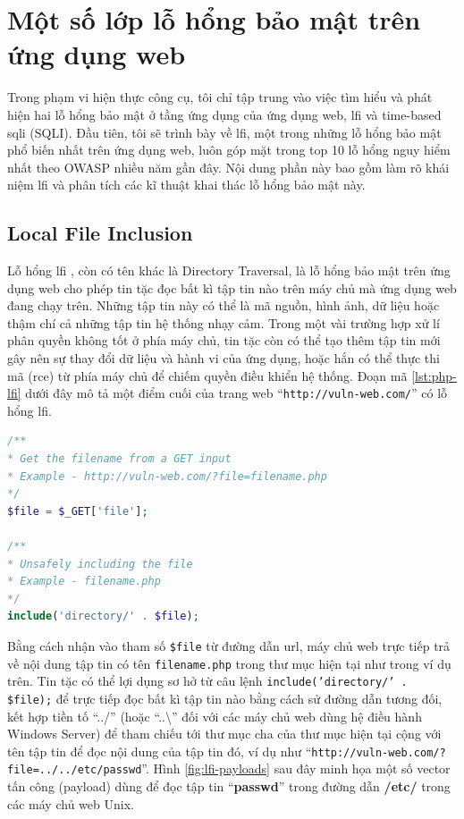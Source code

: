 \chapter{Một số lớp lỗ hổng bảo mật trên ứng dụng web}
Trong phạm vi hiện thực công cụ, tôi chỉ tập trung vào việc tìm hiểu và phát hiện hai lỗ hổng bảo mật ở tầng ứng dụng của ứng dụng web, \acrfull{lfi} và time-based \acrlong{sqli} (SQLI). Đầu tiên, tôi sẽ trình bày về \acrfull{lfi}, một trong những lỗ hổng bảo mật phổ biến nhất trên ứng dụng web, luôn góp mặt trong top 10 lỗ hổng nguy hiểm nhất theo OWASP \parencite{owasp-top-10} nhiều năm gần đây. Nội dung phần này bao gồm làm rõ khái niệm \acrshort{lfi} và phân tích các kĩ thuật khai thác lỗ hổng bảo mật này.
\section{Local File Inclusion}
Lỗ hổng \acrfull{lfi} \parencite{portswigger-directory-traversal, sullivan2011web}, còn có tên khác là Directory Traversal, là lỗ hổng bảo mật trên ứng dụng web cho phép tin tặc đọc bất kì tập tin nào trên máy chủ mà ứng dụng web đang chạy trên. Những tập tin này có thể là mã nguồn, hình ảnh, dữ liệu hoặc thậm chí cả những tập tin hệ thống nhạy cảm. Trong một vài trường hợp xử lí phân quyền không tốt ở phía máy chủ, tin tặc còn có thể tạo thêm tập tin mới gây nên sự thay đổi dữ liệu và hành vi của ứng dụng, hoặc hắn có thể thực thi mã (\acrshort{rce}) từ phía máy chủ để chiếm quyền điều khiển hệ thống. Đoạn mã \ref{lst:php-lfi} dưới đây mô tả một điểm cuối của trang web ``\texttt{http://vuln-web.com/}'' có lỗ hổng \acrshort{lfi}.
\begin{lstlisting}[language=php, label={lst:php-lfi},caption={Đoạn mã PHP có lỗ hổng Local File Inclusion}]
/**
* Get the filename from a GET input
* Example - http://vuln-web.com/?file=filename.php
*/
$file = $_GET['file'];

/**
* Unsafely including the file
* Example - filename.php
*/
include('directory/' . $file);
\end{lstlisting}
Bằng cách nhận vào tham số \texttt{\$file} từ đường dẫn \acrshort{url}, máy chủ web trực tiếp trả về nội dung tập tin có tên \texttt{filename.php} trong thư mục hiện tại như trong ví dụ trên. Tin tặc có thể lợi dụng sơ hở từ câu lệnh \texttt{include('directory/' . \$file);} để trực tiếp đọc bất kì tập tin nào bằng cách sử đường dẫn tương đối, kết hợp tiền tố ``../'' (hoặc ``..\textbackslash'' đối với các máy chủ web dùng hệ điều hành Windows Server) để tham chiếu tới thư mục cha của thư mục hiện tại cộng với tên tập tin để đọc nội dung của tập tin đó, ví dụ như ``\texttt{http://vuln-web.com/?file=../../etc/passwd}''. Hình \ref{fig:lfi-payloads} sau đây minh họa một số vector tấn công (payload) dùng để đọc tập tin ``\textbf{passwd}'' trong đường dẫn \textbf{/etc/} trong các máy chủ web Unix.
